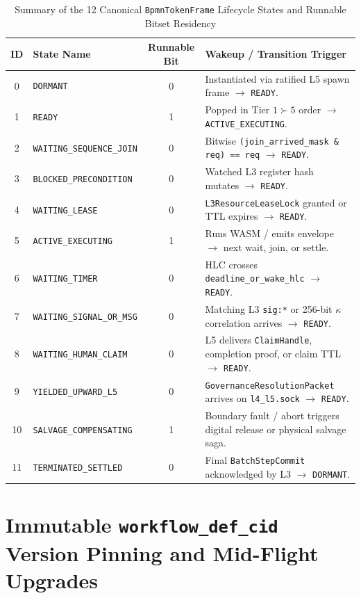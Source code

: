 \begin{table}[htbp]
\centering
\caption{Summary of the 12 Canonical \texttt{BpmnTokenFrame} Lifecycle States and Runnable Bitset Residency}
\label{tab:ch2-12-states}
\footnotesize
\begin{tabular}{@{}clcl@{}}
\toprule
\textbf{ID} & \textbf{State Name} & \textbf{Runnable Bit} & \textbf{Wakeup / Transition Trigger} \\
\midrule
0 & \texttt{DORMANT} & 0 & Instantiated via ratified L5 spawn frame $\to$ \texttt{READY}. \\
1 & \texttt{READY} & 1 & Popped in Tier $1\succ 5$ order $\to$ \texttt{ACTIVE\_EXECUTING}. \\
2 & \texttt{WAITING\_SEQUENCE\_JOIN} & 0 & Bitwise \texttt{(join\_arrived\_mask \& req) == req} $\to$ \texttt{READY}. \\
3 & \texttt{BLOCKED\_PRECONDITION} & 0 & Watched L3 register hash mutates $\to$ \texttt{READY}. \\
4 & \texttt{WAITING\_LEASE} & 0 & \texttt{L3ResourceLeaseLock} granted or TTL expires $\to$ \texttt{READY}. \\
5 & \texttt{ACTIVE\_EXECUTING} & 1 & Runs WASM / emits envelope $\to$ next wait, join, or settle. \\
6 & \texttt{WAITING\_TIMER} & 0 & HLC crosses \texttt{deadline\_or\_wake\_hlc} $\to$ \texttt{READY}. \\
7 & \texttt{WAITING\_SIGNAL\_OR\_MSG} & 0 & Matching L3 \texttt{sig:*} or 256-bit $\kappa$ correlation arrives $\to$ \texttt{READY}. \\
8 & \texttt{WAITING\_HUMAN\_CLAIM} & 0 & L5 delivers \texttt{ClaimHandle}, completion proof, or claim TTL $\to$ \texttt{READY}. \\
9 & \texttt{YIELDED\_UPWARD\_L5} & 0 & \texttt{GovernanceResolutionPacket} arrives on \texttt{l4\_l5.sock} $\to$ \texttt{READY}. \\
10 & \texttt{SALVAGE\_COMPENSATING} & 1 & Boundary fault / abort triggers digital release or physical salvage saga. \\
11 & \texttt{TERMINATED\_SETTLED} & 0 & Final \texttt{BatchStepCommit} acknowledged by L3 $\to$ \texttt{DORMANT}. \\
\bottomrule
\end{tabular}
\end{table}

\section{Immutable \texttt{workflow\_def\_cid} Version Pinning and Mid-Flight Upgrades}
\label{sec:ch2-version-pinning}

